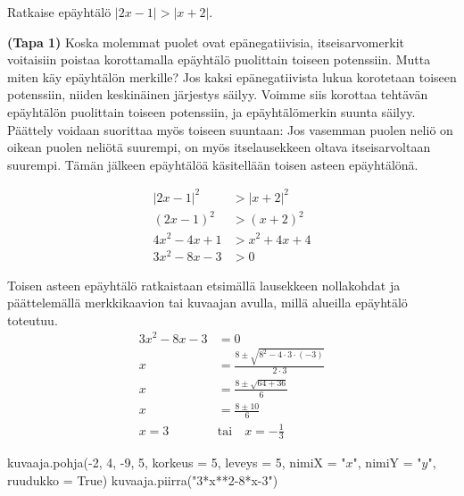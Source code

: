\begin{esimerkki} Ratkaise epäyhtälö $|2x-1|>|x+2|$.

\begin{esimratk} \textbf{(Tapa 1)} Koska molemmat puolet ovat epänegatiivisia, itseisarvomerkit voitaisiin poistaa korottamalla epäyhtälö puolittain 		toiseen potenssiin. Mutta miten käy epäyhtälön merkille? Jos kaksi epänegatiivista lukua korotetaan toiseen potenssiin, niiden keskinäinen järjestys säilyy. Voimme siis korottaa tehtävän epäyhtälön puolittain toiseen potenssiin, ja epäyhtälömerkin suunta säilyy. Päättely voidaan suorittaa myös toiseen suuntaan: Jos vasemman puolen neliö on oikean puolen neliötä suurempi, on myös itselausekkeen oltava itseisarvoltaan suurempi. Tämän jälkeen epäyhtälöä käsitellään toisen asteen epäyhtälönä.

\begin{align*}
|2x-1|^2 & >|x+2|^2 \\
(2x-1)^2 & >(x+2)^2 \\
4x^2-4x+1 & >x^2+4x+4 \\
3x^2-8x-3 & >0
\end{align*}

Toisen asteen epäyhtälö ratkaistaan etsimällä lausekkeen nollakohdat ja päättelemällä merkkikaavion tai kuvaajan avulla, millä alueilla epäyhtälö toteutuu.
\begin{align*}
3x^2-8x-3 & =0 \\
x & =\frac{8\pm\sqrt{8^2-4\cdot3\cdot(-3)}}{2\cdot 3} \\
x & =\frac{8\pm\sqrt{64+36}}{6} \\
x & =\frac{8\pm 10}{6} \\
x=3 \quad & \text{tai} \quad x=-\frac{1}{3}
\end{align*}

\begin{merkkikaavio}{2}

	\merkkikaavioMerkki{$+$}
	\merkkikaavioMerkki{$-$}
	\merkkikaavioMerkki{$+$}

\end{merkkikaavio}
\begin{kuva}
  kuvaaja.pohja(-2, 4,  -9, 5, korkeus = 5, leveys = 5, nimiX = "$x$", nimiY = "$y$", ruudukko = True)
  kuvaaja.piirra("3*x**2-8*x-3")
\end{kuva}


\end{esimratk}
\end{esimerkki}
